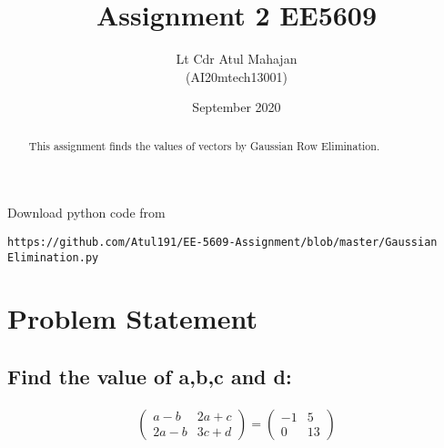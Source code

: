 \documentclass[journal,12pt,twocolumn]{IEEEtran}
\title{Assignment 2 EE5609}
\author{Lt Cdr Atul Mahajan\\ (AI20mtech13001) }
\date{September 2020}
\newcommand{\myvec}[1]{\ensuremath{\begin{pmatrix}#1\end{pmatrix}}}
\begin{document}
\maketitle
\begin{abstract}
This assignment finds the values of vectors by Gaussian Row Elimination.
\end{abstract}
Download python code from 
\begin{lstlisting}
https://github.com/Atul191/EE-5609-Assignment/blob/master/Gaussian Elimination.py
\end{lstlisting}
\section{Problem Statement}
\subsection{Find the value of a,b,c and d:}
\begin{align}
\label{eq1}
\myvec{a-b&2a+c\\2a-b&3c+d}
=
\myvec{-1&5\\0&13}
\end{align}
\end{document}
